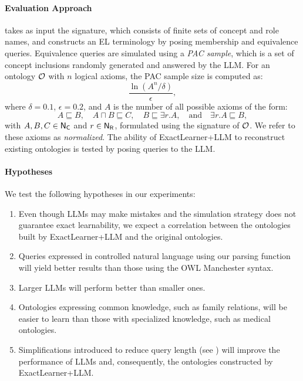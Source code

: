 \paragraph{Evaluation Approach}
\label{par:evaluation-approach}
 takes as input the signature, which consists of finite sets of concept and role names, and constructs an \gls{EL} terminology by posing membership and equivalence queries.
%
Equivalence queries are simulated using a \emph{\gls{PAC} sample}, which is a set of concept inclusions randomly generated and answered by the \gls{LLM}.
%
For an ontology \(\mathcal{O}\) with \(n\) logical axioms, the \gls{PAC} sample size is computed as:
\[
\frac{\ln(A^n / \delta)}{\epsilon},
\]
where \(\delta = 0.1\), \(\epsilon = 0.2\), and \(A\) is the number of all possible axioms of the form:
\[
A \sqsubseteq B, \quad A \sqcap B \sqsubseteq C, \quad B \sqsubseteq \exists r.A, \quad \text{and} \quad \exists r.A \sqsubseteq B,
\]
with \(A, B, C \in {\sf N_C}\) and \(r \in {\sf N_R}\), formulated using the signature of \(\mathcal{O}\).
%
We refer to these axioms as \emph{normalized}.
%
The ability of ExactLearner+LLM to reconstruct existing ontologies is tested by posing queries to the \gls{LLM}.
%

\paragraph{Hypotheses}
\label{par:hypotheses}
We test the following hypotheses in our experiments:
%
\begin{enumerate}
    \item Even though \glspl{LLM} may make mistakes and the simulation strategy does not guarantee exact learnability, we expect a correlation between the ontologies built by ExactLearner+LLM and the original ontologies.
    \item Queries expressed in controlled natural language using our parsing function will yield better results than those using the OWL Manchester syntax.
    \item Larger \glspl{LLM} will perform better than smaller ones.
    \item Ontologies expressing common knowledge, such as family relations, will be easier to learn than those with specialized knowledge, such as medical ontologies.
    \item Simplifications introduced to reduce query length (see ) will improve the performance of \glspl{LLM} and, consequently, the ontologies constructed by ExactLearner+LLM.
\end{enumerate}
%

